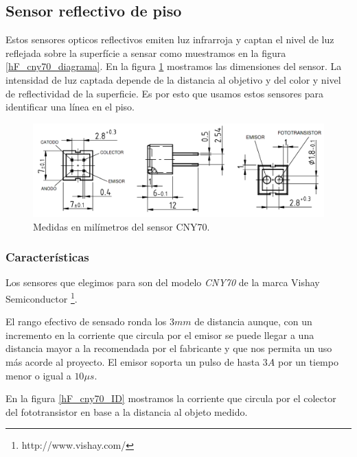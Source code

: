 \subsection{Sensor reflectivo de piso}
\label{h_sensado_piso}

Estos sensores opticos reflectivos emiten luz infrarroja y captan el nivel de luz reflejada sobre la superf\'icie a sensar como muestramos
en la figura \ref{hF_cny70_diagrama}.
En la figura \ref{hF_cny70_dim} mostramos las dimensiones del sensor.
La intensidad de luz captada depende de la distancia al objetivo y del color y nivel de reflectividad de la superficie.
Es por esto que usamos estos sensores para identificar una l\'inea en el piso.

\begin{figure}[ht]
	\centering
	\includegraphics[scale=0.25]{cny70_dim.png}
	\caption{Medidas en mil\'imetros del sensor CNY70.}
	\label{hF_cny70_dim}
\end{figure}

\subsubsection{Caracter\'isticas}
\label{h_sensado_piso_caracteristicas}

Los sensores que elegimos para son del modelo \emph{CNY70} de la marca Vishay Semiconductor \footnote{http://www.vishay.com/}.

El rango efectivo de sensado ronda los $3 mm$ de distancia aunque, con un incremento en la corriente que circula por el emisor
se puede llegar a una distancia mayor a la recomendada por el fabricante y que nos permita un uso m\'as acorde al proyecto.
El emisor soporta un pulso de hasta $3 A$ por un tiempo menor o igual a $10\mu s$.

En la figura \ref{hF_cny70_ID} mostramos la corriente que circula por el colector del fototransistor en base a la distancia al objeto medido.

